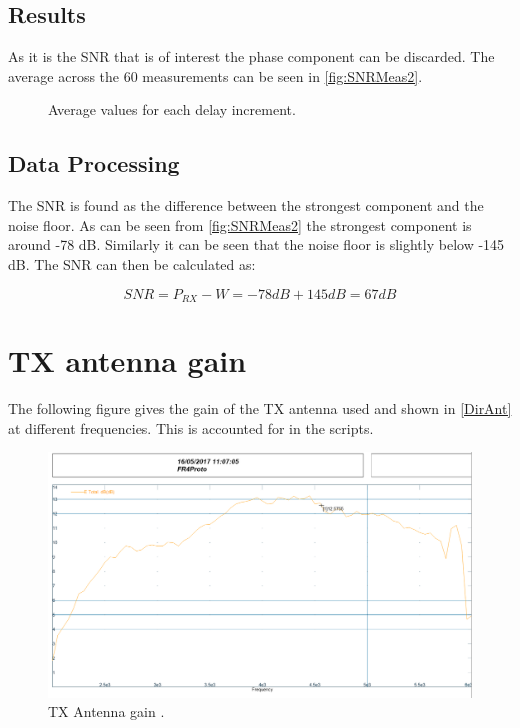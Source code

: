 \subsection{Results}
As it is the SNR that is of interest the phase component can be discarded. The average across the 60 measurements can be seen in \autoref{fig:SNRMeas2}.

\begin{figure}[H]
\centering

\caption{Average values for each delay increment.}
\label{fig:SNRMeas2}
\end{figure}

\subsection{Data Processing}
The SNR is found as the difference between the strongest component and the noise floor. As can be seen from \autoref{fig:SNRMeas2} the strongest component is around -78 dB. Similarly it can be seen that the noise floor is slightly below -145 dB. The SNR can then be calculated as:

\begin{equation}
SNR = P_{RX} - W = -78dB + 145dB = 67 dB
\end{equation}
\begin{where}
\end{where}

\section{TX antenna gain}
\label{ant_adix}
The following figure gives the gain of the TX antenna used and shown in \autoref{DirAnt} at different frequencies. This is accounted for in the scripts. 

\begin{figure}[H]
\centering
\includegraphics[width=1\textwidth]{figures/Fr4Proto1Gain.png}
\caption{TX Antenna gain \citep{TX_antenna}.}
\label{fig:TX_gain}
\end{figure}